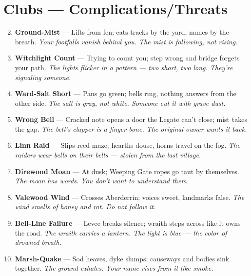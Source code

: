 \section*{Clubs --- Complications/Threats}
\label{sec:mistlands-complications}
\begin{enumerate}
\setcounter{enumi}{1}
\item \textbf{Ground-Mist} --- Lifts from fen; eats tracks by the yard, names by the breath.  
  \hfill \textit{Your footfalls vanish behind you. The mist is following, not rising.}
\item \textbf{Witchlight Count} --- Trying to count you; step wrong and bridge forgets your path.  
  \hfill \textit{The lights flicker in a pattern --- two short, two long. They're signaling someone.}
\item \textbf{Ward-Salt Short} --- Pans go green; bells ring, nothing answers from the other side.  
  \hfill \textit{The salt is gray, not white. Someone cut it with grave dust.}
\item \textbf{Wrong Bell} --- Cracked note opens a door the Legate can't close; mist takes the gap. 
  \hfill \textit{The bell's clapper is a finger bone. The original owner wants it back.}
\item \textbf{Linn Raid} --- Slips reed-maze; hearths douse, horns travel on the fog. 
  \hfill \textit{The raiders wear bells on their belts --- stolen from the last village.}
\item \textbf{Direwood Moan} --- At dusk; Weeping Gate ropes go taut by themselves.  
  \hfill \textit{The moan has words. You don't want to understand them.}
\item \textbf{Valewood Wind} --- Crosses Aberderrin; voices sweet, landmarks false.  
  \hfill \textit{The wind smells of honey and rot. Do not follow it.}
\item \textbf{Bell-Line Failure} --- Levee breaks silence; wraith steps across like it owns the road.  
  \hfill \textit{The wraith carries a lantern. The light is blue --- the color of drowned breath.}
\item \textbf{Marsh-Quake} --- Sod heaves, dyke slumps; causeways and bodies sink together. 
  \hfill \textit{The ground exhales. Your name rises from it like smoke.}

\end{enumerate}
